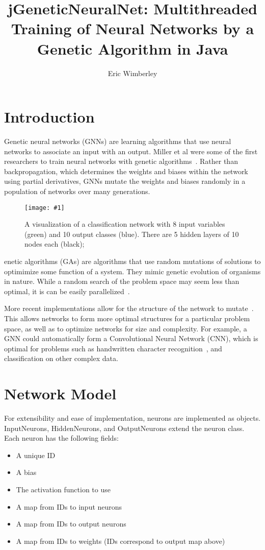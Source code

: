 \documentclass[twocolumn]{article}
\title{jGeneticNeuralNet: Multithreaded Training of Neural Networks by a Genetic Algorithm in Java}
\author{Eric Wimberley}
\newcommand\fig[5]{
	\begin{figure}[H]
		\begin{center}\texttt{[image: \#1]}\end{center}
		\caption{#4}\label{fig:#2}
	\end{figure}
}
\begin{document}
\maketitle

\begin{abstract}
\lipsum[1]
\end{abstract}

\section{Introduction}
Genetic neural networks (GNNs) are learning algorithms that use neural networks to associate an input with an output. Miller et al were some of the first researchers to train neural networks with genetic algorithms~\cite{MillerToddHedge}. Rather than backpropagation, which determines the weights and biases within the network using partial derivatives, GNNs mutate the weights and biases randomly in a population of networks over many generations. 

\fig{images/visualization.png}{networkVis}{0.18}{
A visualization of a classification network with 8 input variables (green) and 10 output classes (blue). There are 5 hidden layers of 10 nodes each (black);
}

Genetic algorithms (GAs) are algorithms that use random mutations of solutions to optimimize some function of a system. They mimic genetic evolution of organisms in nature. While a random search of the problem space may seem less than optimal, it is can be easily parallelized~\cite{Tanese:1989:DGA:915973}.

More recent implementations allow for the structure of the network to mutate~\cite{LamStructure}. This allows networks to form more optimal structures for a particular problem space, as well as to optimize networks for size and complexity. For example, a GNN could automatically form a Convolutional Neural Network (CNN), which is optimal for problems such as handwritten character recognition~\cite{ConvolutionalCharacterClassification}, and classification on other complex data. 

\section{Network Model}
For extensibility and ease of implementation, neurons are implemented as objects. InputNeurons, HiddenNeurons, and OutputNeurons extend the neuron class. Each neuron has the following fields:

\begin{itemize}
	\item A unique ID 
	\item A bias
	\item The activation function to use
	\item A map from IDs to input neurons
	\item A map from IDs to output neurons
 	\item A map from IDs to weights (IDs correspond to output map above)
\end{itemize}
\end{document}
